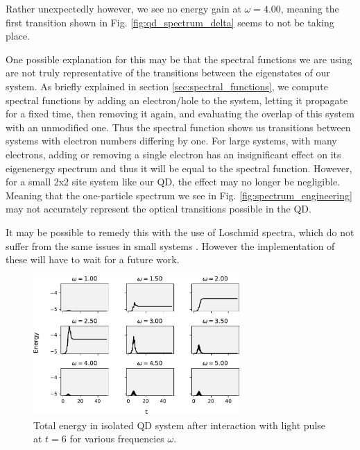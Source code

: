 \medskip

Rather unexpectedly however, we see no energy gain at $\omega = 4.00$, meaning the first transition shown in Fig. \ref{fig:qd_spectrum_delta} seems to not be taking place.

\medskip

One possible explanation for this may be that the spectral functions we are using are not truly representative of the transitions between the eigenstates of our system. As briefly explained in section \ref{sec:spectral_functions}, we compute spectral functions by adding an electron/hole to the system, letting it propagate for a fixed time, then removing it again, and evaluating the overlap of this system with an unmodified one. Thus the spectral function shows us transitions between systems with electron numbers differing by one. For large systems, with many electrons, adding or removing a single electron has an insignificant effect on its eigenenergy spectrum and thus it will be equal to the spectral function. However, for a small 2x2 site system like our QD, the effect may no longer be negligible. Meaning that the one-particle spectrum we see in Fig. \ref{fig:spectrum_engineering} may not accurately represent the optical transitions possible in the QD.

\medskip
It may be possible to remedy this with the use of Loschmid spectra, which do not suffer from the same issues in small systems \cite{loschmidt}. However the implementation of these will have to wait for a future work. 

\medskip

\begin{figure}[!hbt]
    \centering
    \includegraphics[width=0.7\textwidth]{graph/9test.pdf}
    \caption{Total energy in isolated QD system after interaction with light pulse at $t=6$ for various frequencies $\omega$.}
    \label{fig:qd_9_total_energy}
\end{figure}